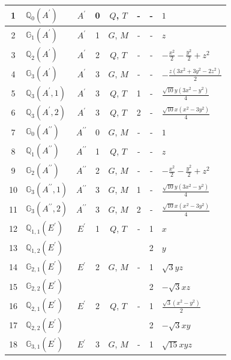 \documentclass[fleqn,10pt,landscape]{jsarticle}
\begin{document}
\begin{longtable}[l]{clcccccl}
1 & $\mathbb{Q}_{0}(A^{\prime})$ & $A^{\prime}$ & 0 & $Q$, $T$ & - & - & $1$ \\ \hline
2 & $\mathbb{G}_{1}(A^{\prime})$ & $A^{\prime}$ & 1 & $G$, $M$ & - & - & $z$ \\ \hline
3 & $\mathbb{Q}_{2}(A^{\prime})$ & $A^{\prime}$ & 2 & $Q$, $T$ & - & - & $- \frac{x^{2}}{2} - \frac{y^{2}}{2} + z^{2}$ \\ \hline
4 & $\mathbb{G}_{3}(A^{\prime})$ & $A^{\prime}$ & 3 & $G$, $M$ & - & - & $- \frac{z \left(3 x^{2} + 3 y^{2} - 2 z^{2}\right)}{2}$ \\ \hline
5 & $\mathbb{Q}_{3}(A^{\prime},1)$ & $A^{\prime}$ & 3 & $Q$, $T$ & 1 & - & $\frac{\sqrt{10} y \left(3 x^{2} - y^{2}\right)}{4}$ \\ \hline
6 & $\mathbb{Q}_{3}(A^{\prime},2)$ & $A^{\prime}$ & 3 & $Q$, $T$ & 2 & - & $\frac{\sqrt{10} x \left(x^{2} - 3 y^{2}\right)}{4}$ \\ \hline
7 & $\mathbb{G}_{0}(A^{\prime\prime})$ & $A^{\prime\prime}$ & 0 & $G$, $M$ & - & - & $1$ \\ \hline
8 & $\mathbb{Q}_{1}(A^{\prime\prime})$ & $A^{\prime\prime}$ & 1 & $Q$, $T$ & - & - & $z$ \\ \hline
9 & $\mathbb{G}_{2}(A^{\prime\prime})$ & $A^{\prime\prime}$ & 2 & $G$, $M$ & - & - & $- \frac{x^{2}}{2} - \frac{y^{2}}{2} + z^{2}$ \\ \hline
10 & $\mathbb{G}_{3}(A^{\prime\prime},1)$ & $A^{\prime\prime}$ & 3 & $G$, $M$ & 1 & - & $\frac{\sqrt{10} y \left(3 x^{2} - y^{2}\right)}{4}$ \\ \hline
11 & $\mathbb{G}_{3}(A^{\prime\prime},2)$ & $A^{\prime\prime}$ & 3 & $G$, $M$ & 2 & - & $\frac{\sqrt{10} x \left(x^{2} - 3 y^{2}\right)}{4}$ \\ \hline
12 & $\mathbb{Q}_{1,1}(E^{\prime})$ & $E^{\prime}$ & 1 & $Q$, $T$ & - & 1 & $x$ \\
13 & $\mathbb{Q}_{1,2}(E^{\prime})$ &  &  &  &  & 2 & $y$ \\ \hline
14 & $\mathbb{G}_{2,1}(E^{\prime})$ & $E^{\prime}$ & 2 & $G$, $M$ & - & 1 & $\sqrt{3} y z$ \\
15 & $\mathbb{G}_{2,2}(E^{\prime})$ &  &  &  &  & 2 & $- \sqrt{3} x z$ \\ \hline
16 & $\mathbb{Q}_{2,1}(E^{\prime})$ & $E^{\prime}$ & 2 & $Q$, $T$ & - & 1 & $\frac{\sqrt{3} \left(x^{2} - y^{2}\right)}{2}$ \\
17 & $\mathbb{Q}_{2,2}(E^{\prime})$ &  &  &  &  & 2 & $- \sqrt{3} x y$ \\ \hline
18 & $\mathbb{G}_{3,1}(E^{\prime})$ & $E^{\prime}$ & 3 & $G$, $M$ & - & 1 & $\sqrt{15} x y z$ \\

\end{longtable}
\end{document}
